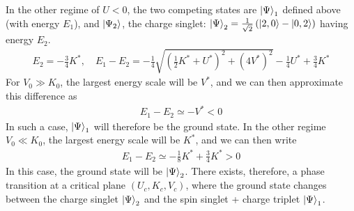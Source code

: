 In the other regime of \(U<0\), the two competing states are \(\ket{\Psi}_1\) defined above (with energy \(E_1\)), and \(\ket{\Psi_2}\), the charge singlet: \(\ket{\Psi}_2 = \frac{1}{\sqrt 2}\left( \ket{2,0} - \ket{0,2} \right)\) having energy \(E_2\).
\begin{equation}\begin{aligned}
	E_2 = -\frac{3}{4}K^*, \quad E_1 - E_2 = -\frac{1}{4}\sqrt{\left( \frac{1}{2}K^* + U^* \right)^2 + (4V^*)^2} - \frac{1}{4}U^* + \frac{3}{4}K^*
\end{aligned}\end{equation}
For \(V_0 \gg K_0\), the largest energy scale will be \(V^*\), and we can then approximate this difference as
\begin{equation}\begin{aligned}
	E_1 - E_2 \simeq -V^* < 0
\end{aligned}\end{equation}
In such a case, \(\ket{\Psi}_1\) will therefore be the ground state. In the other regime \(V_0 \ll K_0\), the largest energy scale will be \(K^*\), and we can then write
\begin{equation}\begin{aligned}
	E_1 - E_2 \simeq - \frac{1}{8}K^* + \frac{3}{4}K^* > 0
\end{aligned}\end{equation}
In this case, the ground state will be \(\ket{\Psi}_2\). There exists, therefore, a phase transition at a critical plane \((U_c, K_c, V_c)\), where the ground state changes between the charge singlet \(\ket{\Psi}_2\) and the spin singlet + charge triplet \(\ket{\Psi}_1\).

